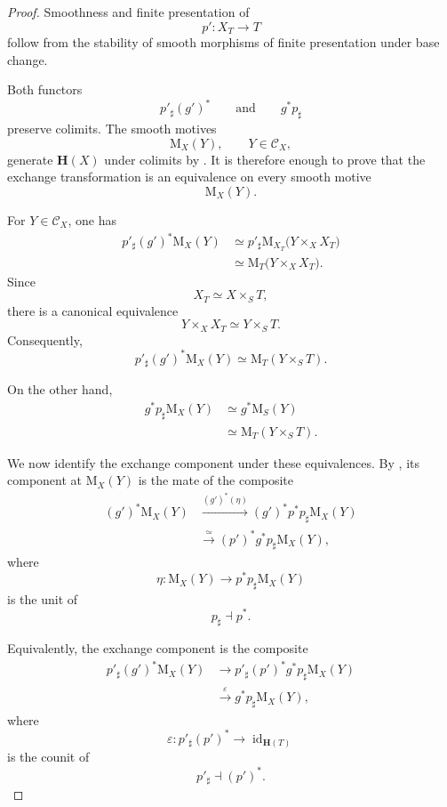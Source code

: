 \begin{proof}
Smoothness and finite presentation of
\[
    p'
    \colon
    X_T
    \longrightarrow
    T
\]
follow from the stability of smooth morphisms of finite presentation
under base change.

Both functors
\[
    p'_\sharp(g')^*
    \qquad\text{and}\qquad
    g^*p_\sharp
\]
preserve colimits. The smooth motives
\[
    \mathrm M_X(Y),
    \qquad
    Y\in\mathcal C_X,
\]
generate \(\mathbf H(X)\) under colimits by
.
It is therefore enough to prove that the exchange transformation is an
equivalence on every smooth motive
\[
    \mathrm M_X(Y).
\]

For \(Y\in\mathcal C_X\), one has
\[
\begin{aligned}
    p'_\sharp(g')^*\mathrm M_X(Y)
    &\simeq
    p'_\sharp
    \mathrm M_{X_T}
    \bigl(
        Y\times_XX_T
    \bigr)
    \\
    &\simeq
    \mathrm M_T
    \bigl(
        Y\times_XX_T
    \bigr).
\end{aligned}
\]
Since
\[
    X_T
    \simeq
    X\times_ST,
\]
there is a canonical equivalence
\[
    Y\times_XX_T
    \simeq
    Y\times_ST.
\]
Consequently,
\[
    p'_\sharp(g')^*\mathrm M_X(Y)
    \simeq
    \mathrm M_T(Y\times_ST).
\]

On the other hand,
\[
\begin{aligned}
    g^*p_\sharp\mathrm M_X(Y)
    &\simeq
    g^*\mathrm M_S(Y)
    \\
    &\simeq
    \mathrm M_T(Y\times_ST).
\end{aligned}
\]

We now identify the exchange component under these equivalences. By
, its component at
\(\mathrm M_X(Y)\) is the mate of the composite
\[
\begin{aligned}
    (g')^*\mathrm M_X(Y)
    &\xrightarrow{(g')^*(\eta)}
    (g')^*p^*p_\sharp\mathrm M_X(Y)
    \\
    &\xrightarrow{\simeq}
    (p')^*g^*p_\sharp\mathrm M_X(Y),
\end{aligned}
\]
where
\[
    \eta
    \colon
    \mathrm M_X(Y)
    \longrightarrow
    p^*p_\sharp\mathrm M_X(Y)
\]
is the unit of
\[
    p_\sharp
    \dashv
    p^*.
\]

Equivalently, the exchange component is the composite
\[
\begin{aligned}
    p'_\sharp(g')^*\mathrm M_X(Y)
    &\longrightarrow
    p'_\sharp(p')^*g^*p_\sharp\mathrm M_X(Y)
    \\
    &\xrightarrow{\varepsilon}
    g^*p_\sharp\mathrm M_X(Y),
\end{aligned}
\]
where
\[
    \varepsilon
    \colon
    p'_\sharp(p')^*
    \longrightarrow
    \operatorname{id}_{\mathbf H(T)}
\]
is the counit of
\[
    p'_\sharp
    \dashv
    (p')^*.
\]


\end{proof}
